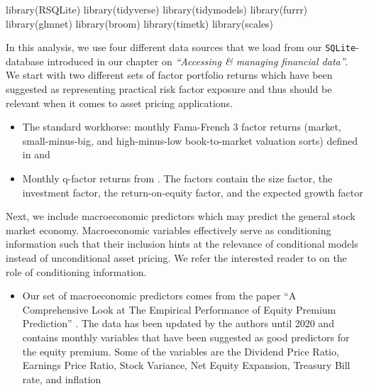 \documentclass[
]{krantz}
\newenvironment{Shaded}{\begin{snugshade}}{\end{snugshade}}
\newcommand{\FunctionTok}[1]{\textcolor[rgb]{0,0,0}{#1}}
\newcommand{\NormalTok}[1]{#1}
\providecommand{\tightlist}{%
  \setlength{\itemsep}{0pt}\setlength{\parskip}{0pt}}
\begin{document}
\begin{Shaded}
\begin{Highlighting}[]
\FunctionTok{library}\NormalTok{(RSQLite)}
\FunctionTok{library}\NormalTok{(tidyverse)}
\FunctionTok{library}\NormalTok{(tidymodels)}
\FunctionTok{library}\NormalTok{(furrr)}
\FunctionTok{library}\NormalTok{(glmnet)}
\FunctionTok{library}\NormalTok{(broom)}
\FunctionTok{library}\NormalTok{(timetk)}
\FunctionTok{library}\NormalTok{(scales)}
\end{Highlighting}
\end{Shaded}

In this analysis, we use four different data sources that we load from our \texttt{SQLite}-database introduced in our chapter on \emph{``Accessing \& managing financial data''}. We start with two different sets of factor portfolio returns which have been suggested as representing practical risk factor exposure and thus should be relevant when it comes to asset pricing applications.

\begin{itemize}
\tightlist
\item
  The standard workhorse: monthly Fama-French 3 factor returns (market, small-minus-big, and high-minus-low book-to-market valuation sorts) defined in \citet{Fama1992} and \citet{Fama1993}
\item
  Monthly q-factor returns from \citet{Hou2015}. The factors contain the size factor, the investment factor, the return-on-equity factor, and the expected growth factor
\end{itemize}

Next, we include macroeconomic predictors which may predict the general stock market economy. Macroeconomic variables effectively serve as conditioning information such that their inclusion hints at the relevance of conditional models instead of unconditional asset pricing. We refer the interested reader to \citet{Cochrane2005} on the role of conditioning information.

\begin{itemize}
\tightlist
\item
  Our set of macroeconomic predictors comes from the paper ``A Comprehensive Look at The Empirical Performance of Equity Premium Prediction'' \citep{Goyal2008}. The data has been updated by the authors until 2020 and contains monthly variables that have been suggested as good predictors for the equity premium. Some of the variables are the Dividend Price Ratio, Earnings Price Ratio, Stock Variance, Net Equity Expansion, Treasury Bill rate, and inflation
\end{itemize}
\end{document}
